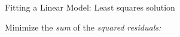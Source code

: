 \documentclass[xcolor=x11names,handout,compress]{beamer}
\renewcommand{\(}{\begin{columns}}
\renewcommand{\)}{\end{columns}}
\newcommand{\<}[1]{\begin{column}{#1}}
\renewcommand{\>}{\end{column}}
\begin{document}
\begin{frame}{Fitting a Linear Model: Least squares solution}

Minimize the {\it sum} of the {\it squared} {\it residuals:}

\begin{columns}[T]
\column{\textwidth}

\end{columns}
\end{frame}
\end{document}
